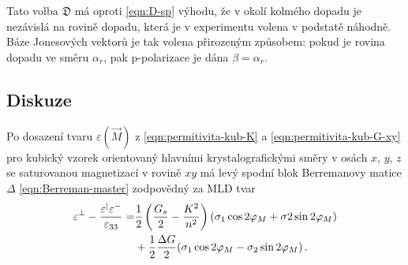 Tato volba $\mathfrak{D}$ má oproti \eqref{eqn:D-sp} výhodu, že v okolí kolmého dopadu je nezávislá na rovině dopadu, která je v experimentu volena v podstatě náhodně.
Báze Jonesových vektorů je tak volena přirozeným způsobem: pokud je rovina dopadu ve směru $\alpha_r$, pak p-polarizace je dána $\beta=\alpha_r$.



\subsection*{Diskuze}

Po dosazení tvaru $\varepsilon(\vec{M})$ z \eqref{eqn:permitivita-kub-K} a \eqref{eqn:permitivita-kub-G-xy} pro kubický vzorek orientovaný hlavními krystalografickými směry v osách $x$, $y$, $z$ se saturovanou magnetizací v rovině $xy$ má levý spodní blok Berremanovy matice $\Delta$ \eqref{eqn:Berreman-master} zodpovědný za MLD tvar
\begin{align}
    \varepsilon^\perp - \frac{\varepsilon^\vert\varepsilon^-}{\varepsilon_{33}} =& \frac{1}{2}\left( \frac{G_s}{2}-\frac{K^2}{n^2} \right) (\sigma_1\cos2\varphi_M + \sigma2\sin2\varphi_M) \\
                                                                                &+ \frac{1}{2}\frac{\Delta G}{2}(\sigma_1\cos2\varphi_M - \sigma_2 \sin2\varphi_M) \,.
\end{align}


